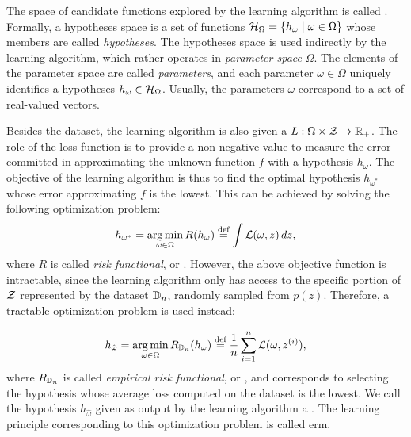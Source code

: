The space of candidate functions explored by the learning algorithm is called . Formally, a hypotheses space is a set of functions $\HypSpace = \Set{h_{\omega} \mid \omega \in \Omega}$ whose members are called \emph{hypotheses}. The hypotheses space is used indirectly by the learning algorithm, which rather operates in \emph{parameter space} $\Omega$. The elements of the parameter space are called \emph{parameters}, and each parameter $\omega \in \Omega$ uniquely identifies a hypotheses $h_{\omega} \in \HypSpace$. Usually, the parameters $\omega$ correspond to a set of real-valued vectors.

Besides the dataset, the learning algorithm is also given a  $L: \Omega \times \Cal{Z} \shortrightarrow \Real_+$. The role of the loss function is to provide a non-negative value to measure the error committed in approximating the unknown function $f$ with a hypothesis $h_{\omega}$. The objective of the learning algorithm is thus to find the optimal hypothesis $h_{\omega^*}$ whose error approximating $f$ is the lowest. This can be achieved by solving the following optimization problem:
$$h_{\omega^*} = \argmin_{\omega \in \Omega} R(h_{\omega}) \defeq \int \Loss(\omega, z)\, dz,$$
where $R$ is called \emph{risk functional}, or . However, the above objective function is intractable, since the learning algorithm only has access to the specific portion of $\Cal{Z}$ represented by the dataset $\mathbb{D}_n$, randomly sampled from $p(z)$. Therefore, a tractable optimization problem is used instead:

$$h_{\hat{\omega}} = \argmin_{\omega \in \Omega} R_{\Data_n}(h_{\omega}) \defeq \frac{1}{n} \sum_{i=1}^n \Loss(\omega, \Pattern{z}{i}),$$
where $R_{\mathbb{D}_n}$ is called \emph{empirical risk functional}, or , and corresponds to selecting the hypothesis whose average loss computed on the dataset is the lowest. We call the hypothesis $h_{\hat{\omega}}$ given as output by the learning algorithm a . The learning principle corresponding to this optimization problem is called \gls{erm}.

